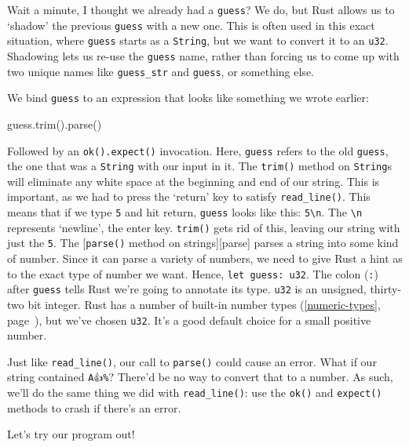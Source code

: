 \documentclass[a4paper,]{book}
\renewcommand*{\hyperref}[2][\ar]{%
  \def\ar{#2}%
  #2 (\autoref{#1}, page~\pageref{#1})}
\newenvironment{Shaded}{\begin{snugshade}}{\end{snugshade}}
\newcommand{\KeywordTok}[1]{\textcolor[rgb]{0.13,0.29,0.53}{\textbf{{#1}}}}
\newcommand{\NormalTok}[1]{{#1}}
\begin{document}
Wait a minute, I thought we already had a \texttt{guess}? We do, but
Rust allows us to `shadow' the previous \texttt{guess} with a new one.
This is often used in this exact situation, where \texttt{guess} starts
as a \texttt{String}, but we want to convert it to an \texttt{u32}.
Shadowing lets us re-use the \texttt{guess} name, rather than forcing us
to come up with two unique names like \texttt{guess\_str} and
\texttt{guess}, or something else.

We bind \texttt{guess} to an expression that looks like something we
wrote earlier:

\begin{Shaded}
\begin{Highlighting}[]
\NormalTok{guess.trim().parse()}
\end{Highlighting}
\end{Shaded}

Followed by an \texttt{ok().expect()} invocation. Here, \texttt{guess}
refers to the old \texttt{guess}, the one that was a \texttt{String}
with our input in it. The \texttt{trim()} method on \texttt{String}s
will eliminate any white space at the beginning and end of our string.
This is important, as we had to press the `return' key to satisfy
\texttt{read\_line()}. This means that if we type \texttt{5} and hit
return, \texttt{guess} looks like this: \texttt{5\textbackslash{}n}. The
\texttt{\textbackslash{}n} represents `newline', the enter key.
\texttt{trim()} gets rid of this, leaving our string with just the
\texttt{5}. The {[}\texttt{parse()} method on strings{]}{[}parse{]}
parses a string into some kind of number. Since it can parse a variety
of numbers, we need to give Rust a hint as to the exact type of number
we want. Hence, \texttt{let\ guess:\ u32}. The colon (\texttt{:}) after
\texttt{guess} tells Rust we're going to annotate its type. \texttt{u32}
is an unsigned, thirty-two bit integer. Rust has
\hyperref[numeric-types]{a number of built-in number types}, but we've
chosen \texttt{u32}. It's a good default choice for a small positive
number.

Just like \texttt{read\_line()}, our call to \texttt{parse()} could
cause an error. What if our string contained \texttt{A👍\%}? There'd be
no way to convert that to a number. As such, we'll do the same thing we
did with \texttt{read\_line()}: use the \texttt{ok()} and
\texttt{expect()} methods to crash if there's an error.

Let's try our program out!

\begin{Shaded}
\end{Shaded}
\end{document}
